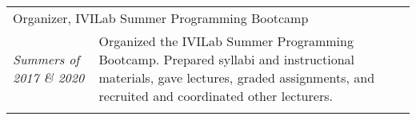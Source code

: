 \bigskip

\begin{tabularx}{\linewidth}{lX}
    \multicolumn{2}{l}{\sffamily Organizer, IVILab Summer Programming Bootcamp}\\
    \addlinespace
     \emph{Summers of 2017 \& 2020} & %
     Organized the IVILab Summer Programming Bootcamp.\newline
        Prepared syllabi and instructional materials,
        gave lectures, graded assignments, and recruited and coordinated other
    lecturers.\\
  \addlinespace
\end{tabularx}
